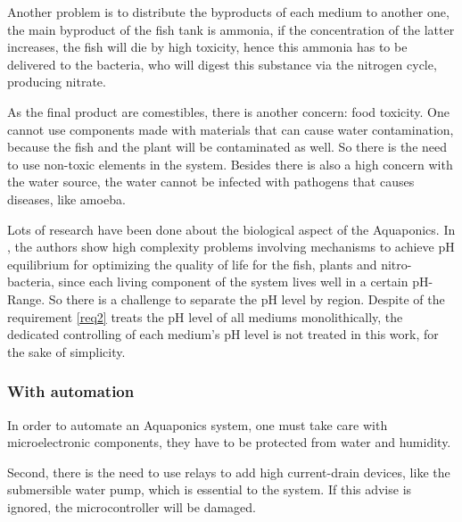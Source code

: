 Another problem is to distribute the byproducts of each medium to another one,
the main byproduct of the fish tank is ammonia,
if the concentration of the latter increases,
the fish will die by high toxicity,
hence this ammonia has to be delivered to the bacteria,
who will digest this substance via the nitrogen cycle,
producing nitrate.

As the final product are comestibles,
there is another concern: food toxicity.
One cannot use components made with materials that can cause water contamination,
because the fish and the plant will be contaminated as well.
So there is the need to use non-toxic elements in the system.
Besides there is also a high concern with the water source,
the water cannot be infected with pathogens that causes diseases,
like amoeba.

Lots of research have been done about the biological aspect of the Aquaponics.
In \cite{GoddekDelaideMankasinghEtAl2015},
the authors show high complexity problems involving mechanisms to achieve pH equilibrium for optimizing the quality of life for the fish,
plants and nitro-bacteria,
since each living component of the system lives well in a certain pH-Range.
So there is a challenge to separate the pH level by region.
Despite of the requirement \ref{req2} treats the pH level of all mediums monolithically,
the dedicated controlling of each medium's pH level is not treated in this work,
for the sake of simplicity.

\subsubsection{With automation}
In order to automate an Aquaponics system,
one must take care with microelectronic components,
they have to be protected from water and humidity.

Second,
there is the need to use relays to add high current-drain devices,
like the submersible water pump,
which is essential to the system.
If this advise is ignored,
the microcontroller will be damaged.
